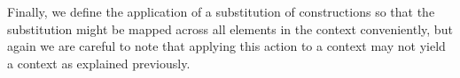 Finally, we define the application of a substitution of constructions
so that the substitution might be mapped across all elements in the
context conveniently, but again we are careful to note that applying
this action to a context may not yield a context as explained previously.
\begin{code}%
\>[0]\AgdaSpace{}%
\AgdaSymbol{:}\AgdaSpace{}%
\AgdaSpace{}%
\AgdaOperator{\AgdaFunction{⇒[}}\AgdaSpace{}%
\AgdaSpace{}%
\AgdaSpace{}%
\AgdaOperator{\AgdaFunction{]}}\AgdaSpace{}%
\AgdaSpace{}%
\AgdaSpace{}%
\AgdaSpace{}%
\AgdaSpace{}%
\AgdaSpace{}%
\AgdaSpace{}%
\AgdaSpace{}%
\AgdaOperator{\AgdaFunction{⇒[}}\AgdaSpace{}%
\AgdaSpace{}%
\AgdaSpace{}%
\AgdaOperator{\AgdaFunction{]}}\AgdaSpace{}%
\<%
\end{code}
